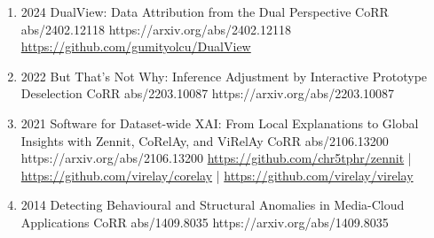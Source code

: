 {\begin{enumerate}
        \item {}
                        {2024}
                        {DualView: Data Attribution from the Dual Perspective}
                        {CoRR abs/2402.12118}
                        {https://arxiv.org/abs/2402.12118}
                        {\\\href{https://github.com/gumityolcu/DualView}{https://github.com/gumityolcu/DualView}}

        \item {}
                        {2022}
                        {But That's Not Why: Inference Adjustment by Interactive Prototype Deselection}
                        {CoRR abs/2203.10087}
                        {https://arxiv.org/abs/2203.10087}

        \item {}
                        {2021}
                        {Software for Dataset-wide XAI: From Local Explanations to Global Insights with Zennit, CoRelAy, and ViRelAy}
                        {CoRR abs/2106.13200}
                        {https://arxiv.org/abs/2106.13200}
                        {   \href{https://github.com/chr5tphr/zennit}{https://github.com/chr5tphr/zennit} | \\
                            \href{https://github.com/virelay/corelay}{https://github.com/virelay/corelay} |
                            \href{https://github.com/virelay/virelay}{https://github.com/virelay/virelay}
                        }

        \item {}
                        {2014}
                        {Detecting Behavioural and Structural Anomalies in Media-Cloud Applications}
                        {CoRR abs/1409.8035}
                        {https://arxiv.org/abs/1409.8035}

    \end{enumerate}

}


